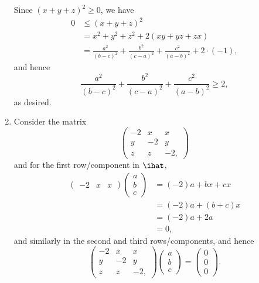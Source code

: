 \begin{enumerate}
          Since \((x + y + z)^2 \geq 0\), we have
          \begin{align*}
              0 & \leq (x + y + z)^2                                                                      \\
                & = x^2 + y^2 + z^2 + 2 (xy + yz + zx)                                                    \\
                & = \frac{a^2}{(b - c)^2} + \frac{b^2}{(c - a)^2} + \frac{c^2}{(a - b)^2} + 2 \cdot (-1),
          \end{align*}
          and hence
          \[
              \frac{a^2}{(b - c)^2} + \frac{b^2}{(c - a)^2} + \frac{c^2}{(a - b)^2} \geq 2,
          \]
          as desired.

    \item Consider the matrix
          \[
              \begin{pmatrix}
                  -2 & x  & x   \\
                  y  & -2 & y   \\
                  z  & z  & -2,
              \end{pmatrix}
          \]
          and for the first row/component in \(\ihat\),
          \begin{align*}
              \begin{pmatrix}
                  -2 & x & x
              \end{pmatrix}
              \begin{pmatrix}
                  a \\
                  b \\
                  c
              \end{pmatrix}
               & = (-2) a + bx + cx   \\
               & = (-2) a + (b + c) x \\
               & = (-2) a + 2a        \\
               & = 0,
          \end{align*}
          and similarly in the second and third rows/components, and hence
          \[
              \begin{pmatrix}
                  -2 & x  & x   \\
                  y  & -2 & y   \\
                  z  & z  & -2,
              \end{pmatrix}
              \begin{pmatrix}
                  a \\
                  b \\
                  c
              \end{pmatrix}
              =
              \begin{pmatrix}
                  0 \\
                  0 \\
                  0
              \end{pmatrix}.
          \]


\end{enumerate}
